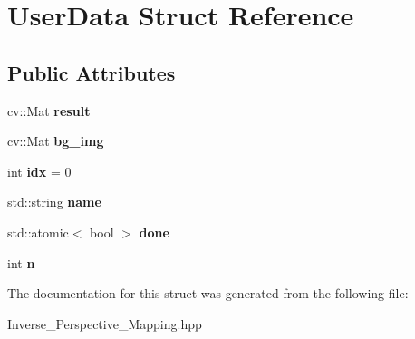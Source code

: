 \hypertarget{struct_user_data}{}\section{User\+Data Struct Reference}
\label{struct_user_data}
\subsection*{Public Attributes}
\begin{DoxyCompactItemize}
\item 
\mbox{\label{struct_user_data_aa5b3e223f9ad1c8b0132064a367723b2}} 
cv\+::\+Mat {\bfseries result}
\item 
\mbox{\label{struct_user_data_a37f86e9e08d1a02a2b510cdde3ec0394}} 
cv\+::\+Mat {\bfseries bg\+\_\+img}
\item 
\mbox{\label{struct_user_data_a88110f3ddcfd5b00826faab13fb13abe}} 
int {\bfseries idx} = 0
\item 
\mbox{\label{struct_user_data_a4892dadd0deb6baf83eabbc88452031c}} 
std\+::string {\bfseries name}
\item 
\mbox{\label{struct_user_data_a1cd0b7ff5cc6999c68ea56089bbdec8c}} 
std\+::atomic$<$ bool $>$ {\bfseries done}
\item 
\mbox{\label{struct_user_data_aa65a11d18e67730d1d0889430e19a7be}} 
int {\bfseries n}
\end{DoxyCompactItemize}


The documentation for this struct was generated from the following file\+:\begin{DoxyCompactItemize}
\item 
Inverse\+\_\+\+Perspective\+\_\+\+Mapping.\+hpp\end{DoxyCompactItemize}
